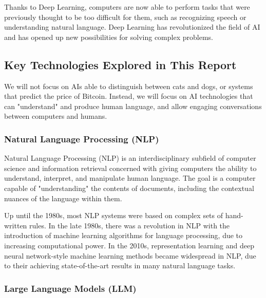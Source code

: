 \documentclass{article}
\begin{document}
Thanks to Deep Learning, computers are now able to perform tasks that
were previously thought to be too difficult for them, such as recognizing
speech or understanding natural language. Deep Learning has revolutionized
the field of AI and has opened up new possibilities for solving complex
problems.


\subsection{Key Technologies Explored in This Report}

We will not focus on AIs able to distinguish between cats and dogs, or systems that predict the price of Bitcoin. Instead, we will focus on AI technologies that can "understand" and produce human language, and allow engaging conversations between computers and humans.


\subsubsection{Natural Language Processing (NLP)}

Natural Language Processing (NLP) is an interdisciplinary subfield
of computer science and information retrieval concerned with giving
computers the ability to understand, interpret, and manipulate human
language. The goal is a computer capable of "understanding"
the contents of documents, including the contextual nuances of the
language within them.

Up until the 1980s, most NLP systems were based on complex sets of
hand-written rules. In the late 1980s, there was a revolution in NLP with
the introduction of machine learning algorithms for language processing,
due to increasing computational power. In the 2010s, representation learning
and deep neural network-style machine learning methods became widespread in
NLP, due to their achieving state-of-the-art results in many natural language
tasks.


\subsubsection{Large Language Models (LLM)}
\end{document}
